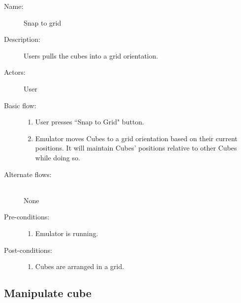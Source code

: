 \documentclass[12pt]{article}
\begin{document}
    \begin{description}
      \item[Name:] Snap to grid
      \item[Description:] Users pulls the cubes into a grid orientation.
      \item[Actors:] User
      \item[Basic flow:] \hfill
        \begin{enumerate}
	  \item{User presses ``Snap to Grid" button.}
	  \item{Emulator moves Cubes to a grid orientation based on their current positions. It will maintain Cubes' positions relative to other Cubes while doing so.}
        \end{enumerate}
      \item[Alternate flows:] \hfill \\
	None	
      \item[Pre-conditions:] \hfill
        \begin{enumerate}
	  \item{Emulator is running.}
        \end{enumerate}
      \item[Post-conditions:] \hfill
        \begin{enumerate}
	  \item{Cubes are arranged in a grid.}
        \end{enumerate}
    \end{description}

  \subsection{Manipulate cube}
\end{document}
